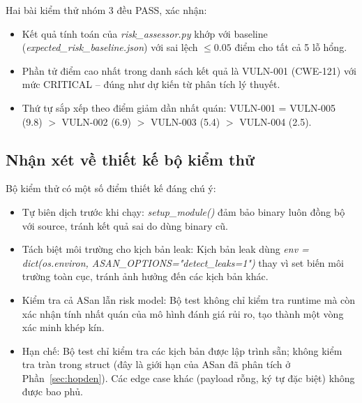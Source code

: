 Hai bài kiểm thử nhóm 3 đều PASS, xác nhận:
\begin{itemize}
    \item Kết quả tính toán của \textit{risk\_assessor.py} khớp với baseline
          (\textit{expected\_risk\_baseline.json}) với sai lệch $\leq 0.05$
          điểm cho tất cả 5 lỗ hổng.
    \item Phần tử điểm cao nhất trong danh sách kết quả là VULN-001 (CWE-121)
          với mức CRITICAL -- đúng như dự kiến từ phân tích lý thuyết.
    \item Thứ tự sắp xếp theo điểm giảm dần nhất quán:
          VULN-001 = VULN-005 (9.8) $>$ VULN-002 (6.9) $>$ VULN-003 (5.4)
          $>$ VULN-004 (2.5).
\end{itemize}

\subsection{Nhận xét về thiết kế bộ kiểm thử}

Bộ kiểm thử có một số điểm thiết kế đáng chú ý:

\begin{itemize}
    \item Tự biên dịch trước khi chạy: \textit{setup\_module()} đảm bảo binary
          luôn đồng bộ với source, tránh kết quả sai do dùng binary cũ.
    \item Tách biệt môi trường cho kịch bản leak: Kịch bản leak dùng
          \textit{env = dict(os.environ, ASAN\_OPTIONS="detect\_leaks=1")} thay
          vì set biến môi trường toàn cục, tránh ảnh hưởng đến các kịch bản khác.
    \item Kiểm tra cả ASan lẫn risk model: Bộ test không chỉ kiểm tra runtime
          mà còn xác nhận tính nhất quán của mô hình đánh giá rủi ro, tạo thành
          một vòng xác minh khép kín.
    \item Hạn chế: Bộ test chỉ kiểm tra các kịch bản được lập trình sẵn; không
          kiểm tra tràn trong struct (đây là giới hạn của ASan đã phân tích ở
          Phần~\ref{sec:hopden}). Các edge case khác (payload rỗng, ký tự đặc
          biệt) không được bao phủ.
\end{itemize}
